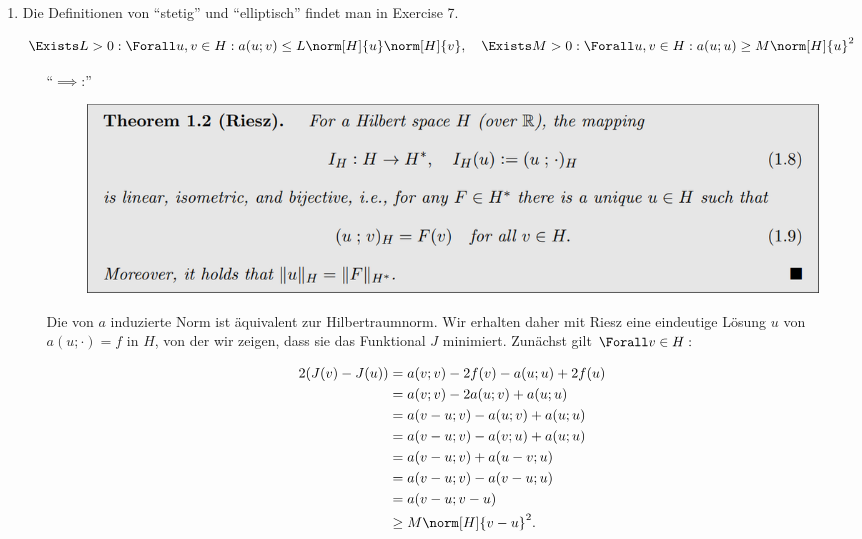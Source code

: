 \begin{solution}

\phantom{}

\begin{enumerate}[label = \textbf{\alph*)}]

  \item Die Definitionen von \enquote{stetig} und \enquote{elliptisch} findet man in Exercise 7.

  \begin{align*}
    \Exists L > 0:
    \Forall u, v \in H:
    a(u; v) \leq L \norm[H]{u} \norm[H]{v},
    \quad
    \Exists M > 0:
    \Forall u, v \in H:
    a(u; u) \geq M \norm[H]{u}^2
  \end{align*}

  \begin{itemize}

    \item
    [\enquote{$\implies$:}]

    \begin{figure}[h!]
      \centering
      \includegraphics[width = 0.9 \textwidth]{../../../Fundament-LaTeX/images/NumPDEs/NumPDEs - Theorem 1.2 (Riesz).png}
    \end{figure}

    Die von $a$ induzierte Norm ist äquivalent zur Hilbertraumnorm.
    Wir erhalten daher mit Riesz eine eindeutige Lösung $u$ von $a(u; \cdot) = f$ in $H$, von der wir zeigen, dass sie das Funktional $J$ minimiert.
    Zunächst gilt $\Forall v \in H:$

    \begin{align*}
      2 (J(v) - J(u))
      & =
      a(v; v) - 2f(v) - a(u; u) + 2 f(u) \\
      & =
      a(v; v) -2a(u; v) + a(u; u) \\
      & =
      a(v-u; v) - a(u; v) + a(u; u) \\
      & =
      a(v-u; v) - a(v; u) + a(u; u) \\
      & =
      a(v-u; v) + a(u-v; u) \\
      & =
      a(v-u; v) - a(v-u; u) \\
      & =
      a(v-u; v-u) \\
      & \geq
      M \norm[H]{v-u}^2.
    \end{align*}


\end{itemize}
\end{enumerate}
\end{solution}
